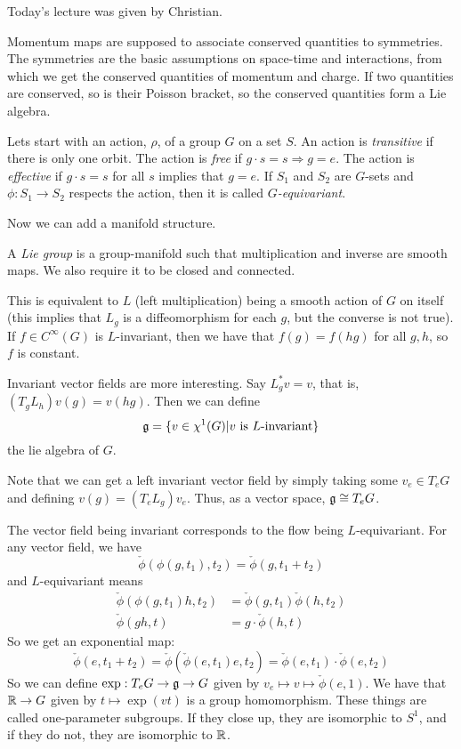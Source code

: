  \setcounter{lecture}{12}

 Today's lecture was given by Christian.

 Momentum maps are supposed to associate conserved quantities to
 symmetries.  The symmetries are the basic assumptions on
 space-time and interactions, from which we get the conserved
 quantities of momentum and charge.  If two quantities are
 conserved, so is their Poisson bracket, so the conserved
 quantities form a Lie algebra.

 Lets start with an action, $\rho$, of a group $G$ on a set $S$.
 An action is \emph{transitive} if there is only one orbit.  The
 action is \emph{free} if $g\cdot s=s \Rightarrow g=e$.  The
 action is \emph{effective} if $g\cdot s=s$ for all $s$ implies
 that $g=e$.  If $S_1$ and $S_2$ are $G$-sets and $\phi:S_1\to
 S_2$ respects the action, then it is called
 \emph{$G$-equivariant}.

 Now we can add a manifold structure.
 \begin{definition}
   A \emph{Lie group} is a group-manifold such that multiplication
   and inverse are smooth maps.  We also require it to be closed
   and connected.
 \end{definition}
 This is equivalent to $L$ (left multiplication) being a smooth
 action of $G$ on itself (this implies that $L_g$ is a
 diffeomorphism for each $g$, but the converse is not true).  If
 $f\in C^\infty (G)$ is $L$-invariant, then we have that
 $f(g)=f(hg)$ for all $g,h$, so $f$ is constant.

 Invariant vector fields are more interesting.  Say $L^*_gv=v$,
 that is, $(T_gL_h)v(g)=v(hg)$.  Then we can define
 \[
    \mathfrak{g} = \{v\in \chi^1(G)|v\text{ is } L\text{-invariant} \}
 \]
 the lie algebra of $G$.

 Note that we can get a left invariant vector field by simply
 taking some $v_e\in T_eG$ and defining $v(g)=(T_eL_g)v_e$.  Thus,
 as a vector space, $\mathfrak{g}\cong T_eG$.

 The vector field being invariant corresponds to the flow being
 $L$-equivariant.  For any vector field, we have
 \[
    \check \phi (\phi(g,t_1),t_2) = \check \phi(g,t_1+t_2)
 \]
 and $L$-equivariant means
 \begin{align*}
    \check \phi(\phi(g,t_1)h,t_2)&=\check \phi(g,t_1)\check
    \phi(h,t_2)\\
    \check \phi(gh,t)&= g\cdot \check\phi(h,t)
 \end{align*}
 So we get an exponential map:
\[
    \check \phi(e,t_1+t_2) = \check\phi(\check\phi(e,t_1)e,t_2) =
    \check\phi(e,t_1)\cdot \check\phi(e,t_2)
\]
So we can define $\exp:T_eG\to \mathfrak{g}\to G$ given by $v_e\mapsto
v\mapsto \check\phi(e,1)$.  We have that $\mathbb{R}\to G$ given by
$t\mapsto \exp(vt)$ is a group homomorphism.  These things are
called one-parameter subgroups.  If they close up, they are
isomorphic to $S^1$, and if they do not, they are isomorphic to
$\mathbb{R}$.

